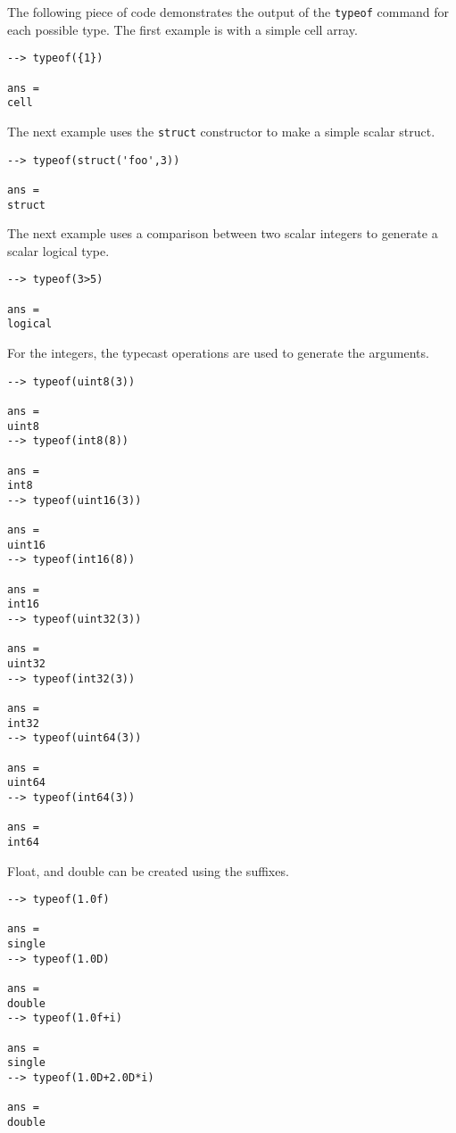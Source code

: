 The following piece of code demonstrates the output of the \verb|typeof| 
command for each possible type.  The first example is with a simple cell array.
\begin{verbatim}
--> typeof({1})

ans = 
cell
\end{verbatim}
The next example uses the \verb|struct| constructor to make a simple scalar struct.
\begin{verbatim}
--> typeof(struct('foo',3))

ans = 
struct
\end{verbatim}
The next example uses a comparison between two scalar integers to generate 
a scalar logical type.
\begin{verbatim}
--> typeof(3>5)

ans = 
logical
\end{verbatim}
For the integers, the typecast operations are used to generate the arguments.
\begin{verbatim}
--> typeof(uint8(3))

ans = 
uint8
--> typeof(int8(8))

ans = 
int8
--> typeof(uint16(3))

ans = 
uint16
--> typeof(int16(8))

ans = 
int16
--> typeof(uint32(3))

ans = 
uint32
--> typeof(int32(3))

ans = 
int32
--> typeof(uint64(3))

ans = 
uint64
--> typeof(int64(3))

ans = 
int64
\end{verbatim}
Float, and double can be created using the suffixes.
\begin{verbatim}
--> typeof(1.0f)

ans = 
single
--> typeof(1.0D)

ans = 
double
--> typeof(1.0f+i)

ans = 
single
--> typeof(1.0D+2.0D*i)

ans = 
double
\end{verbatim}
